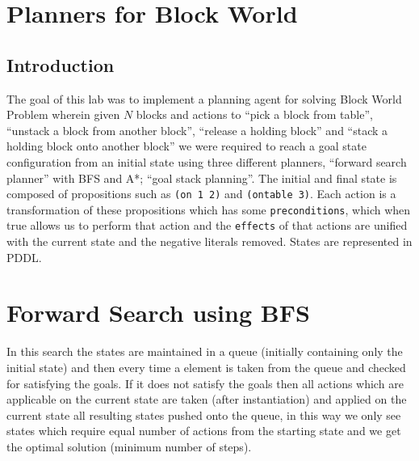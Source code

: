\documentclass{article}
\begin{document}
\maketitle
\section{Planners for Block World}
\subsection{Introduction}
The goal of this lab was to implement a planning agent for solving Block World Problem wherein given $N$ blocks and actions to ``pick a block from table'', ``unstack a block from another block'', ``release a holding block'' and ``stack a holding block onto another block'' we were required to reach a goal state configuration from an initial state using three different planners, ``forward search planner'' with BFS and A*; ``goal stack planning''. The initial and final state is composed of propositions such as \verb|(on 1 2)| and \verb|(ontable 3)|. Each action is a transformation of these propositions which has some \verb|preconditions|, which when true allows us to perform that action and the \verb|effects| of that actions are unified with the current state and the negative literals removed. States are represented in PDDL.

\section{Forward Search using BFS}
In this search the states are maintained in a queue (initially containing only the initial state) and then every time a element is taken from the queue and checked for satisfying the goals. If it does not satisfy the goals then all actions which are applicable on the current state are taken (after instantiation) and applied on the current state all resulting states pushed onto the queue, in this way we only see states which require equal number of actions from the starting state and we get the optimal solution (minimum number of steps).

\pagebreak
\end{document}

